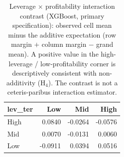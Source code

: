 \begin{table}[htbp]
\centering
\caption{Leverage $\times$ profitability interaction contrast (XGBoost, primary specification): observed cell mean minus the additive expectation (row margin $+$ column margin $-$ grand mean). A positive value in the high-leverage / low-profitability corner is descriptively consistent with non-additivity (H$_4$). The contrast is not a ceteris-paribus interaction estimator.}
\label{tab:v2_lev_roa_contrast}
\small
\begin{tabular}{lrrr}
\toprule
lev\_ter & Low & Mid & High \\
\midrule
High & 0.0840 & -0.0264 & -0.0576 \\
Mid & 0.0070 & -0.0131 & 0.0060 \\
Low & -0.0911 & 0.0394 & 0.0516 \\
\bottomrule
\end{tabular}
\end{table}

